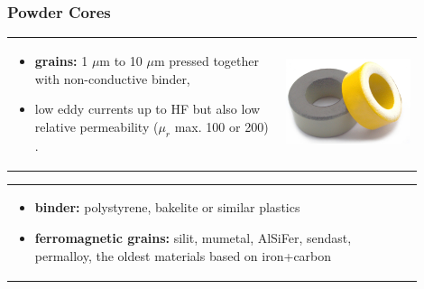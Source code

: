 \documentclass{beamer}
\begin{document}
	\begin{frame}
	\frametitle{Powder Cores}
		\begin{tabular}{m{0.6\linewidth} m{0.3\linewidth}}
		\begin{itemize}
		\item \textbf{grains:} 1 $\mu$m to 10 $\mu$m pressed together with non-conductive binder, 
		\item low eddy currents up to HF but also low relative permeability ($\mu_r$ max. 100 or 200) .
	\end{itemize} 
	& \includegraphics[scale=0.25]{obr11_zelezoprach.png}
	\end{tabular}
	\begin{tabular}{p{0.9\linewidth}}
	\begin{itemize}
		\item \textbf{binder:} polystyrene, bakelite or similar plastics
		\item \textbf{ferromagnetic grains:} silit, mumetal, AlSiFer, sendast, permalloy, the oldest materials based on iron+carbon
	\end{itemize} 
	\end{tabular}
  \end{frame}
\end{document}
